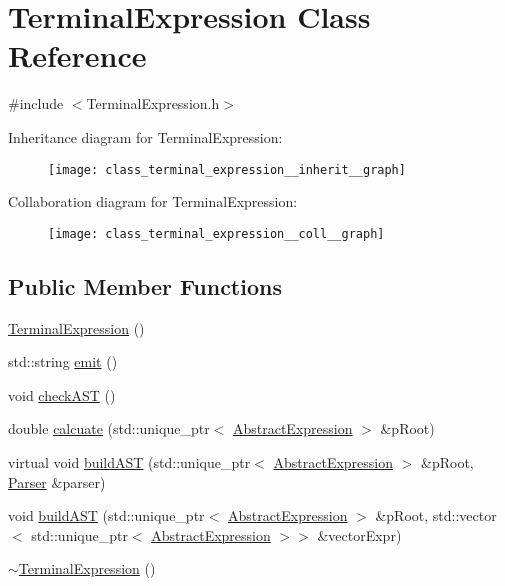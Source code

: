 \hypertarget{class_terminal_expression}{}\section{Terminal\+Expression Class Reference}
\label{class_terminal_expression}


{\ttfamily \#include $<$Terminal\+Expression.\+h$>$}



Inheritance diagram for Terminal\+Expression\+:
\nopagebreak
\begin{figure}[H]
\begin{center}
\leavevmode
\texttt{[image: class\_terminal\_expression\_\_inherit\_\_graph]}
\end{center}
\end{figure}


Collaboration diagram for Terminal\+Expression\+:
\nopagebreak
\begin{figure}[H]
\begin{center}
\leavevmode
\texttt{[image: class\_terminal\_expression\_\_coll\_\_graph]}
\end{center}
\end{figure}
\subsection*{Public Member Functions}
\begin{DoxyCompactItemize}
\item 
\mbox{\hyperlink{class_terminal_expression_a5fc534eff14a2bf5e8d516aefdde8814}{Terminal\+Expression}} ()
\item 
std\+::string \mbox{\hyperlink{class_terminal_expression_ab18820d8216ab5c2d6111c374aa22423}{emit}} ()
\item 
void \mbox{\hyperlink{class_terminal_expression_acc524881ef522ae0cf1231f2cae2b060}{check\+A\+ST}} ()
\item 
double \mbox{\hyperlink{class_terminal_expression_ac638c0ed2eeb96a2ac41ca5c0e193061}{calcuate}} (std\+::unique\+\_\+ptr$<$ \mbox{\hyperlink{class_abstract_expression}{Abstract\+Expression}} $>$ \&p\+Root)
\item 
virtual void \mbox{\hyperlink{class_terminal_expression_a24eb92076324c9c57539b68015d42baa}{build\+A\+ST}} (std\+::unique\+\_\+ptr$<$ \mbox{\hyperlink{class_abstract_expression}{Abstract\+Expression}} $>$ \&p\+Root, \mbox{\hyperlink{class_parser}{Parser}} \&parser)
\item 
void \mbox{\hyperlink{class_terminal_expression_a5ac1e0df8fe690e3ca5572d7a8f89662}{build\+A\+ST}} (std\+::unique\+\_\+ptr$<$ \mbox{\hyperlink{class_abstract_expression}{Abstract\+Expression}} $>$ \&p\+Root, std\+::vector$<$ std\+::unique\+\_\+ptr$<$ \mbox{\hyperlink{class_abstract_expression}{Abstract\+Expression}} $>$$>$ \&vector\+Expr)
\item 
\mbox{\hyperlink{class_terminal_expression_ab4f5c1c7b7c2ffd2e097a1fcb52fec76}{$\sim$\+Terminal\+Expression}} ()
\end{DoxyCompactItemize}
